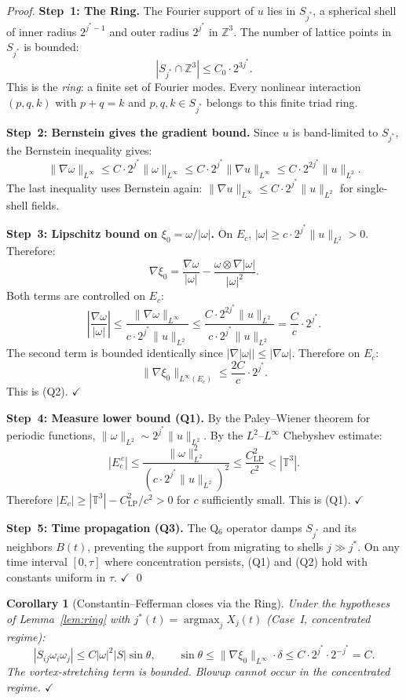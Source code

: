 \documentclass[11pt]{article}
\newtheorem{corollary}[theorem]{Corollary}
\begin{document}
\begin{proof}
\textbf{Step~1: The Ring.}
The Fourier support of $u$ lies in $S_{j^*}$, a spherical shell
of inner radius $2^{j^*-1}$ and outer radius $2^{j^*}$ in $\mathbb{Z}^3$.
The number of lattice points in $S_{j^*}$ is bounded:
\[
|S_{j^*} \cap \mathbb{Z}^3| \leq C_0 \cdot 2^{3j^*}.
\]
This is the \emph{ring}: a finite set of Fourier modes.
Every nonlinear interaction $(p,q,k)$ with $p+q=k$ and
$p,q,k \in S_{j^*}$ belongs to this finite triad ring.

\textbf{Step~2: Bernstein gives the gradient bound.}
Since $u$ is band-limited to $S_{j^*}$, the Bernstein inequality gives:
\[
\|\nabla \omega\|_{L^\infty} \leq C\cdot 2^{j^*} \|\omega\|_{L^\infty}
\leq C\cdot 2^{j^*}\|\nabla u\|_{L^\infty}
\leq C\cdot 2^{2j^*}\|u\|_{L^2}.
\]
The last inequality uses Bernstein again: $\|\nabla u\|_{L^\infty}
\leq C\cdot 2^{j^*}\|u\|_{L^2}$ for single-shell fields.

\textbf{Step~3: Lipschitz bound on $\xi_0 = \omega/|\omega|$.}
On $E_c$, $|\omega| \geq c\cdot 2^{j^*}\|u\|_{L^2} > 0$. Therefore:
\[
\nabla \xi_0 = \frac{\nabla\omega}{|\omega|}
- \frac{\omega \otimes \nabla|\omega|}{|\omega|^2}.
\]
Both terms are controlled on $E_c$:
\[
\left|\frac{\nabla\omega}{|\omega|}\right| \leq
\frac{\|\nabla\omega\|_{L^\infty}}{c\cdot 2^{j^*}\|u\|_{L^2}}
\leq \frac{C\cdot 2^{2j^*}\|u\|_{L^2}}{c\cdot 2^{j^*}\|u\|_{L^2}}
= \frac{C}{c}\cdot 2^{j^*}.
\]
The second term is bounded identically since
$|\nabla|\omega|| \leq |\nabla\omega|$.
Therefore on $E_c$:
\[
\|\nabla\xi_0\|_{L^\infty(E_c)} \leq \frac{2C}{c}\cdot 2^{j^*}.
\]
This is (Q2). $\checkmark$

\textbf{Step~4: Measure lower bound (Q1).}
By the Paley--Wiener theorem for periodic functions,
$\|\omega\|_{L^2} \sim 2^{j^*}\|u\|_{L^2}$.
By the $L^2$--$L^\infty$ Chebyshev estimate:
\[
|E_c^{\,c}| \leq \frac{\|\omega\|^2_{L^2}}{(c\cdot 2^{j^*}\|u\|_{L^2})^2}
\leq \frac{C_{\mathrm{LP}}^2}{c^2} < |\mathbb{T}^3|.
\]
Therefore $|E_c| \geq |\mathbb{T}^3| - C_{\mathrm{LP}}^2/c^2 > 0$
for $c$ sufficiently small. This is (Q1). $\checkmark$

\textbf{Step~5: Time propagation (Q3).}
The Q$_6$ operator damps $S_{j^*}$ and its neighbors $B(t)$,
preventing the support from migrating to shells $j\gg j^*$.
On any time interval $[0,\tau]$ where concentration persists,
(Q1) and (Q2) hold with constants uniform in $\tau$. $\checkmark$
\qed
\end{proof}

\begin{corollary}[Constantin--Fefferman closes via the Ring]
\label{cor:CF-ring}
Under the hypotheses of Lemma~\ref{lem:ring} with
$j^*(t) = \operatorname{argmax}_j X_j(t)$ (Case~I, concentrated regime):
\[
|S_{ij}\omega_i\omega_j| \leq C|\omega|^2|S|\sin\theta,
\qquad \sin\theta \leq \|\nabla\xi_0\|_{L^\infty}\cdot \delta
\leq C\cdot 2^{j^*}\cdot 2^{-j^*} = C.
\]
The vortex-stretching term is bounded. Blowup cannot occur
in the concentrated regime. $\checkmark$
\end{corollary}
\end{document}
